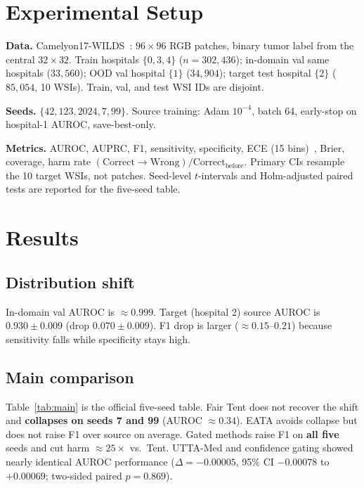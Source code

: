 \documentclass[conference]{IEEEtran}
\begin{document}
\section{Experimental Setup}
\textbf{Data.} Camelyon17-WILDS~\cite{koh2021wilds,bandi2018camelyon17}: $96{\times}96$ RGB patches, binary tumor label from the central $32{\times}32$.
Train hospitals $\{0,3,4\}$ ($n{=}302{,}436$); in-domain val same hospitals ($33{,}560$); OOD val hospital $\{1\}$ ($34{,}904$); target test hospital $\{2\}$ ($85{,}054$, 10 WSIs).
Train, val, and test WSI IDs are disjoint.

\textbf{Seeds.} $\{42,123,2024,7,99\}$.
Source training: Adam $10^{-4}$, batch 64, early-stop on hospital-1 AUROC, save-best-only.

\textbf{Metrics.} AUROC, AUPRC, F1, sensitivity, specificity, ECE (15 bins)~\cite{guo2017calibration}, Brier, coverage, harm rate $(\mathrm{Correct}{\to}\mathrm{Wrong})/\mathrm{Correct}_{\mathrm{before}}$.
Primary CIs resample the 10 target WSIs, not patches.
Seed-level $t$-intervals and Holm-adjusted paired tests are reported for the five-seed table.

\section{Results}
\subsection{Distribution shift}
In-domain val AUROC is ${\approx}0.999$.
Target (hospital 2) source AUROC is $0.930\pm0.009$ (drop $0.070\pm0.009$).
F1 drop is larger (${\approx}0.15$--$0.21$) because sensitivity falls while specificity stays high.

\subsection{Main comparison}
Table~\ref{tab:main} is the official five-seed table.
Fair Tent does not recover the shift and \textbf{collapses on seeds 7 and 99} (AUROC ${\approx}0.34$).
EATA avoids collapse but does not raise F1 over source on average.
Gated methods raise F1 on \textbf{all five} seeds and cut harm ${\approx}25{\times}$ vs.\ Tent.
UTTA-Med and confidence gating showed nearly identical AUROC performance ($\Delta=-0.00005$, 95\% CI $-0.00078$ to $+0.00069$; two-sided paired $p=0.869$).
\end{document}
